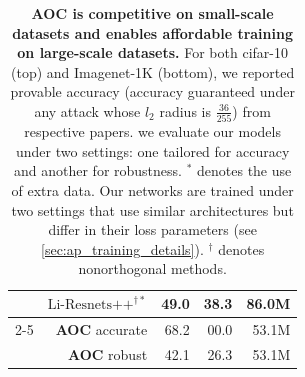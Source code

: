 \begin{table}[ht]
\begin{tabular}{crrrr}
          & $\text{Li-Resnets++}^{\dagger*}$ &   49.0 &   38.3 &     86.0M \\
        \cline{2-5}
          & \textbf{AOC} \small{accurate} &   68.2 &   00.0 &     53.1M \\
          & \textbf{AOC} \small{robust} &   42.1 &   26.3 &     53.1M \\
        \bottomrule
        \end{tabular}
    \caption{\textbf{AOC is competitive on small-scale datasets and enables affordable training on large-scale datasets.} For both cifar-10 (top) and Imagenet-1K (bottom), we reported provable accuracy (accuracy guaranteed under any attack whose $l_2$ radius is $\frac{36}{255}$) from respective papers.
    we evaluate our models under two settings: one tailored for accuracy and another for robustness. $^*$ denotes the use of extra data.%
    Our networks are trained under two settings that use similar architectures but differ in their loss parameters (see \cref{sec:ap_training_details}).
    $^\dagger$ denotes nonorthogonal methods.
    }
    \label{tab:robust_cifar10}
\end{table}



